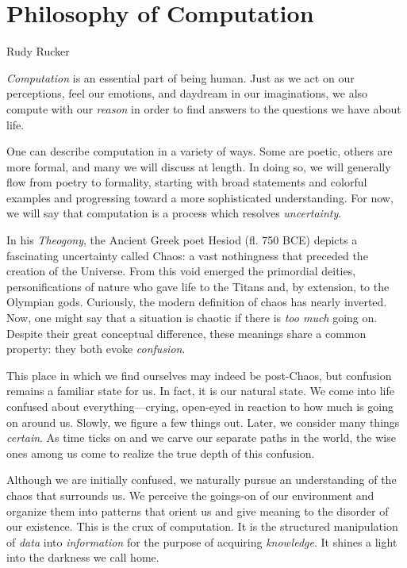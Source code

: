 \part{Philosophy of Computation}

{Rudy Rucker}

\textit{Computation} is an essential part of being human. Just as we act on our perceptions, feel our emotions, and daydream in our imaginations, we also compute with our \textit{reason} in order to find answers to the questions we have about life.

One can describe computation in a variety of ways. Some are poetic, others are more formal, and many we will discuss at length. In doing so, we will generally flow from poetry to formality, starting with broad statements and colorful examples and progressing toward a more sophisticated understanding. For now, we will say that computation is a process which resolves \textit{uncertainty}.

In his \textit{Theogony}, the Ancient Greek poet Hesiod (fl. 750 BCE) depicts a fascinating uncertainty called Chaos: a vast nothingness that preceded the creation of the Universe. From this void emerged the primordial deities, personifications of nature who gave life to the Titans and, by extension, to the Olympian gods. Curiously, the modern definition of chaos has nearly inverted. Now, one might say that a situation is chaotic if there is \textit{too much} going on. Despite their great conceptual difference, these meanings share a common property: they both evoke \textit{confusion}.

This place in which we find ourselves may indeed be post-Chaos, but confusion remains a familiar state for us. In fact, it is our natural state. We come into life confused about everything---crying, open-eyed in reaction to how much is going on around us. Slowly, we figure a few things out. Later, we consider many things \textit{certain}. As time ticks on and we carve our separate paths in the world, the wise ones among us come to realize the true depth of this confusion.

Although we are initially confused, we naturally pursue an understanding of the chaos that surrounds us. We perceive the goings-on of our environment and organize them into patterns that orient us and give meaning to the disorder of our existence. This is the crux of computation. It is the structured manipulation of \textit{data} into \textit{information} for the purpose of acquiring \textit{knowledge}. It shines a light into the darkness we call home.


